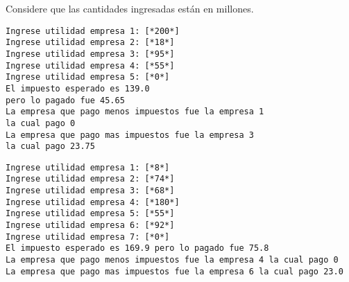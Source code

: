 \begin{enumerate}
    Considere que las cantidades ingresadas están en millones.
    

    \begin{lstlisting}[style=consola]
Ingrese utilidad empresa 1: [*200*]
Ingrese utilidad empresa 2: [*18*]
Ingrese utilidad empresa 3: [*95*]
Ingrese utilidad empresa 4: [*55*]
Ingrese utilidad empresa 5: [*0*]
El impuesto esperado es 139.0 
pero lo pagado fue 45.65
La empresa que pago menos impuestos fue la empresa 1 
la cual pago 0
La empresa que pago mas impuestos fue la empresa 3 
la cual pago 23.75
    \end{lstlisting}

    \begin{lstlisting}[style=consola]
Ingrese utilidad empresa 1: [*8*]
Ingrese utilidad empresa 2: [*74*]
Ingrese utilidad empresa 3: [*68*]
Ingrese utilidad empresa 4: [*180*]
Ingrese utilidad empresa 5: [*55*]
Ingrese utilidad empresa 6: [*92*]
Ingrese utilidad empresa 7: [*0*]
El impuesto esperado es 169.9 pero lo pagado fue 75.8
La empresa que pago menos impuestos fue la empresa 4 la cual pago 0
La empresa que pago mas impuestos fue la empresa 6 la cual pago 23.0

    \end{lstlisting}
    
\end{enumerate}
